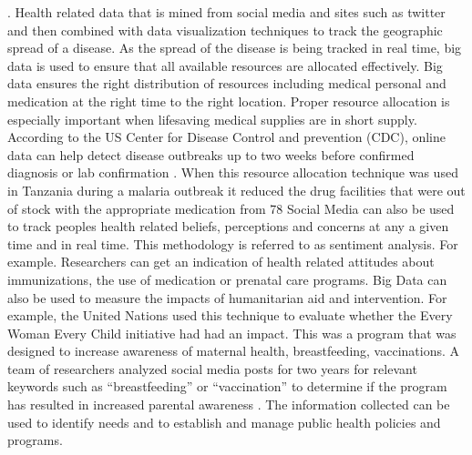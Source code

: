 \documentclass[sigconf]{acmart}
\begin{document}
.  
Health related data that is mined from social media and sites such as twitter and then combined with data visualization techniques to track the geographic spread of a disease. As the spread of the disease is being tracked in real time, big data is used to ensure that all available resources are allocated effectively. Big data ensures the right distribution of resources including medical personal and medication at the right time to the right location. Proper resource allocation is especially important when lifesaving medical supplies are in short supply. According to the US Center for Disease Control and prevention (CDC), online data can help detect disease outbreaks up to two weeks before confirmed diagnosis or lab confirmation \cite{Glopls}. When this resource allocation technique was used in Tanzania during a malaria outbreak it reduced the drug facilities that were out of stock with the appropriate medication from 78%
Social Media can also be used to track peoples health related beliefs, perceptions and concerns at any a given time and in real time. This methodology is referred to as sentiment analysis. For example. Researchers can get an indication of health related attitudes about immunizations, the use of medication or prenatal care programs.  Big Data can also be used to measure the impacts of humanitarian aid and intervention. For example, the United Nations used this technique to evaluate whether the Every Woman Every Child initiative had had an impact. This was a program that was designed to increase awareness of maternal health, breastfeeding, vaccinations. A team of researchers analyzed social media posts for two years for relevant keywords such as “breastfeeding” or “vaccination” to determine if the program has resulted in increased parental awareness \cite{DevEcon}. The information collected can be used to identify needs and to establish and manage public health policies and programs.
\end{document}
